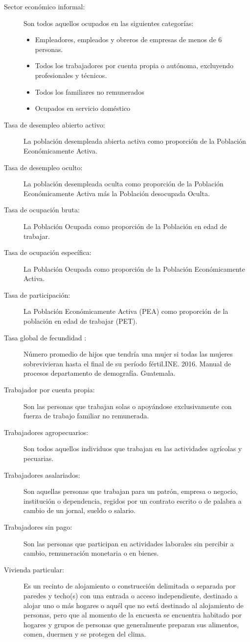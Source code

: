 \begin{description}
	\item[Sector económico informal:] Son todos aquellos ocupados en las siguientes categorías:
	\begin{itemize}\itemsep -1pt
		\item	Empleadores, empleados y obreros de empresas de menos de 6 personas.
		\item	Todos los trabajadores por cuenta propia o autónoma, excluyendo profesionales y técnicos. 
		\item	Todos los familiares no remunerados
		\item	Ocupados en servicio doméstico
	\end{itemize}
	\item[Tasa de desempleo abierto activo:] La población desempleada abierta activa como proporción de la Población Económicamente Activa.
	\item[Tasa de desempleo oculto:] La población desempleada oculta como proporción de la Población Económicamente Activa más la Población desocupada Oculta.
	\item[Tasa de ocupación bruta:] La Población Ocupada como proporción de la Población en edad de trabajar.
	\item[Tasa de ocupación específica:] La Población Ocupada como proporción de la Población Económicamente Activa.
	\item[Tasa de participación:] La Población Económicamente Activa (PEA) como proporción de la población en edad de trabajar (PET).
	\item[Tasa global de fecundidad :]Número promedio de hijos que tendría una mujer si todas las mujeres sobrevivieran hasta el final de su período fértil.INE. 2016. Manual de procesos departamento de demografía. Guatemala.
	\item[Trabajador por cuenta propia:] Son las personas que trabajan solas o apoyándose exclusivamente con fuerza de trabajo familiar no remunerada.
	\item[Trabajadores agropecuarios:] Son todos aquellos individuos que trabajan en las actividades agrícolas y pecuarias.
	\item[Trabajadores asalariados:] Son aquellas personas que trabajan para un patrón, empresa o negocio, institución o dependencia, regidos por un contrato escrito o de palabra a cambio de un jornal, sueldo o salario. 
	\item[Trabajadores sin pago:] Son las personas que participan en actividades laborales sin percibir a cambio, remuneración monetaria o en bienes.
	\item[Vivienda particular:] Es un recinto de alojamiento o construcción delimitada o separada por paredes y techo(s) con una entrada o acceso independiente, destinado a alojar uno o más hogares o aquél que no está destinado al alojamiento de personas, pero que al momento de la encuesta se encuentra habitado por hogares y grupos de personas que generalmente preparan sus alimentos, comen, duermen y se protegen del clima.
	

\end{description}
